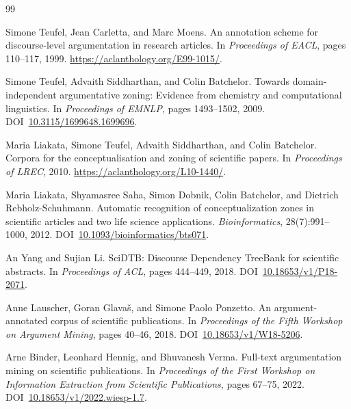 \begin{thebibliography}{99}

Simone Teufel, Jean Carletta, and Marc Moens.
\newblock An annotation scheme for discourse-level argumentation in research articles.
\newblock In \emph{Proceedings of EACL}, pages 110--117, 1999.
\newblock \url{https://aclanthology.org/E99-1015/}.

Simone Teufel, Advaith Siddharthan, and Colin Batchelor.
\newblock Towards domain-independent argumentative zoning: Evidence from chemistry and computational linguistics.
\newblock In \emph{Proceedings of EMNLP}, pages 1493--1502, 2009.
\newblock DOI~\href{https://doi.org/10.3115/1699648.1699696}{10.3115/1699648.1699696}.

Maria Liakata, Simone Teufel, Advaith Siddharthan, and Colin Batchelor.
\newblock Corpora for the conceptualisation and zoning of scientific papers.
\newblock In \emph{Proceedings of LREC}, 2010.
\newblock \url{https://aclanthology.org/L10-1440/}.

Maria Liakata, Shyamasree Saha, Simon Dobnik, Colin Batchelor, and Dietrich Rebholz-Schuhmann.
\newblock Automatic recognition of conceptualization zones in scientific articles and two life science applications.
\newblock \emph{Bioinformatics}, 28(7):991--1000, 2012.
\newblock DOI~\href{https://doi.org/10.1093/bioinformatics/bts071}{10.1093/bioinformatics/bts071}.

An Yang and Sujian Li.
\newblock SciDTB: Discourse Dependency TreeBank for scientific abstracts.
\newblock In \emph{Proceedings of ACL}, pages 444--449, 2018.
\newblock DOI~\href{https://doi.org/10.18653/v1/P18-2071}{10.18653/v1/P18-2071}.

Anne Lauscher, Goran Glava\v{s}, and Simone Paolo Ponzetto.
\newblock An argument-annotated corpus of scientific publications.
\newblock In \emph{Proceedings of the Fifth Workshop on Argument Mining}, pages 40--46, 2018.
\newblock DOI~\href{https://doi.org/10.18653/v1/W18-5206}{10.18653/v1/W18-5206}.

Arne Binder, Leonhard Hennig, and Bhuvanesh Verma.
\newblock Full-text argumentation mining on scientific publications.
\newblock In \emph{Proceedings of the First Workshop on Information Extraction from Scientific Publications}, pages 67--75, 2022.
\newblock DOI~\href{https://doi.org/10.18653/v1/2022.wiesp-1.7}{10.18653/v1/2022.wiesp-1.7}.


\end{thebibliography}
